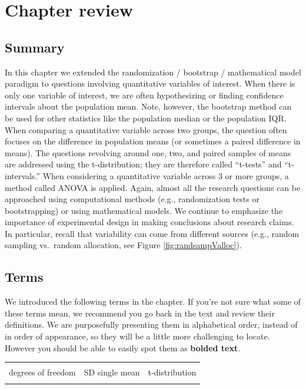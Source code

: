 \documentclass[
  10pt,
  openany]{book}
\begin{document}
\clearpage

\hypertarget{chp19-review}{%
\section{Chapter review}\label{chp19-review}}

\hypertarget{summary-11}{%
\subsection{Summary}\label{summary-11}}

In this chapter we extended the randomization / bootstrap / mathematical model paradigm to questions involving quantitative variables of interest.
When there is only one variable of interest, we are often hypothesizing or finding confidence intervals about the population mean.
Note, however, the bootstrap method can be used for other statistics like the population median or the population IQR.
When comparing a quantitative variable across two groups, the question often focuses on the difference in population means (or sometimes a paired difference in means).
The questions revolving around one, two, and paired samples of means are addressed using the t-distribution; they are therefore called ``t-tests'' and ``t-intervals.'' When considering a quantitative variable across 3 or more groups, a method called ANOVA is applied.
Again, almost all the research questions can be approached using computational methods (e.g., randomization tests or bootstrapping) or using mathematical models.
We continue to emphasize the importance of experimental design in making conclusions about research claims.
In particular, recall that variability can come from different sources (e.g., random sampling vs.~random allocation, see Figure \ref{fig:randsampValloc}).

\hypertarget{terms-11}{%
\subsection{Terms}\label{terms-11}}

We introduced the following terms in the chapter.
If you're not sure what some of these terms mean, we recommend you go back in the text and review their definitions.
We are purposefully presenting them in alphabetical order, instead of in order of appearance, so they will be a little more challenging to locate.
However you should be able to easily spot them as \textbf{bolded text}.

\begin{tabu} to 
\toprule
{} &  & \\
degrees of freedom & SD single mean & t-distribution\\
 &  & \\
\bottomrule
\end{tabu}
\end{document}
